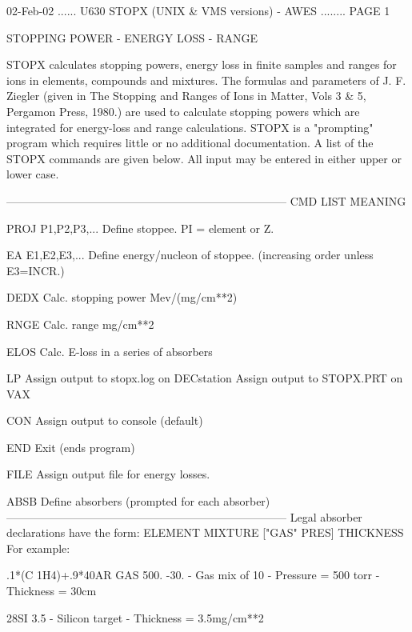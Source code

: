    02-Feb-02 ...... U630  STOPX (UNIX & VMS versions) - AWES ........ PAGE   1
 
                      STOPPING POWER - ENERGY LOSS - RANGE
 
   STOPX  calculates stopping powers, energy loss in finite samples and ranges
   for ions in elements, compounds and mixtures. The formulas  and  parameters
   of  J. F. Ziegler (given in The Stopping and Ranges of Ions in Matter, Vols
   3 & 5, Pergamon Press, 1980.) are used to calculate stopping  powers  which
   are  integrated  for  energy-loss  and  range  calculations.  STOPX  is   a
   "prompting"  program  which requires little or no additional documentation.
   A list of the STOPX commands are given below. All input may be  entered  in
   either upper or lower case.
 
   ---------------------------------------------------------------------------
   CMD   LIST         MEANING
 
   PROJ  P1,P2,P3,... Define stoppee. PI = element or Z.
 
   EA    E1,E2,E3,... Define energy/nucleon of stoppee.
                      (increasing order unless E3=INCR.)
 
   DEDX               Calc. stopping power Mev/(mg/cm**2)
 
   RNGE               Calc. range mg/cm**2
 
   ELOS               Calc. E-loss in a series of absorbers
 
   LP                 Assign output to stopx.log on DECstation
                      Assign output to STOPX.PRT on VAX
 
   CON                Assign output to console (default)
 
   END                Exit (ends program)
 
   FILE               Assign output file for energy losses.
 
   ABSB               Define absorbers (prompted for each absorber)
   ---------------------------------------------------------------------------
   Legal absorber declarations have the form:
   ELEMENT MIXTURE  ["GAS" PRES] THICKNESS
   For example:
 
   .1*(C 1H4)+.9*40AR GAS 500. -30.  - Gas mix of 10%
                                     - Pressure = 500 torr
                                     - Thickness = 30cm
 
   28SI  3.5                         - Silicon target
                                     - Thickness = 3.5mg/cm**2
 
